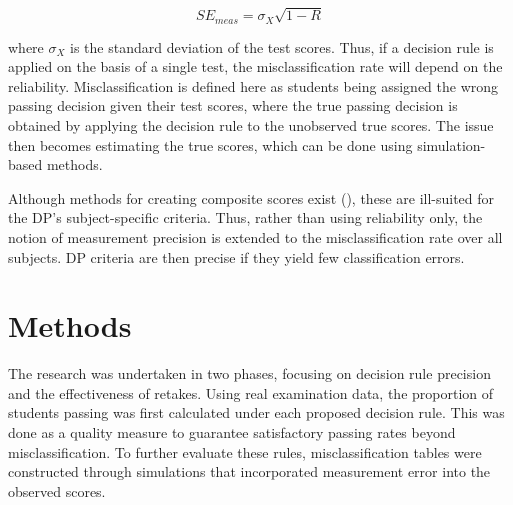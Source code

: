 \documentclass[12pt]{article}
\begin{document}
\begin{equation}
\label{eqn:rel}
    SE_{meas}=\sigma_X\sqrt{1-R}
\end{equation}

\noindent
where $\sigma_X$ is the standard deviation of the test scores. Thus, if a decision rule is applied on the basis of a single test, the misclassification rate will depend on the reliability. Misclassification is defined here as students being assigned the wrong passing decision given their test scores, where the true passing decision is obtained by applying the decision rule to the unobserved true scores. The issue then becomes estimating the true scores, which can be done using simulation-based methods. 

Although methods for creating composite scores exist (\cite{gulliksenTheoryMentalTests1950}), these are ill-suited for the DP’s subject-specific criteria. Thus, rather than using reliability only, the notion of measurement precision is extended to the misclassification rate over all subjects. DP criteria are then precise if they yield few classification errors.


\section{Methods}

The research was undertaken in two phases, focusing on decision rule precision and the effectiveness of retakes. Using real examination data, the proportion of students passing was first calculated under each proposed decision rule. This was done as a quality measure to guarantee satisfactory passing rates beyond misclassification. To further evaluate these rules, misclassification tables were constructed through simulations that incorporated measurement error into the observed scores.
\end{document}
